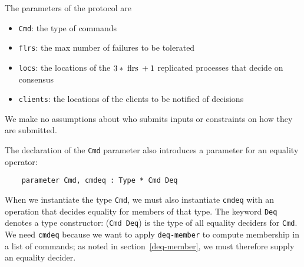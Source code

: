 \documentclass[final]{article}
\newcommand{\listinline}[1]{\text{\lstinline{#1}}}
\begin{document}

The parameters of the protocol are
\begin{itemize}
\item \lstinline{Cmd}: the type of commands
\item \lstinline{flrs}: the max number of failures to be tolerated
\item \lstinline{locs}: the locations of the $3*\listinline{flrs} + 1$
  replicated processes that decide on consensus
\item \lstinline{clients}: the locations of the clients to be notified
  of decisions
\end{itemize}
We make no assumptions about who submits inputs or constraints on how
they are submitted.

The declaration of the \lstinline{Cmd} parameter also introduces a
parameter for an equality operator:
\begin{emlcode}
\begin{lstlisting}
    parameter Cmd, cmdeq : Type * Cmd Deq
\end{lstlisting}
\end{emlcode}
When we instantiate the type \lstinline{Cmd}, we must also instantiate
\lstinline{cmdeq} with an operation that decides equality for members
of that type.  The keyword \lstinline{Deq} denotes a type constructor:
(\lstinline{Cmd Deq}) is the type of all equality deciders for
\lstinline{Cmd}.  We need \lstinline{cmdeq} because we want to apply
\lstinline{deq-member} to compute membership in a list of commands; as
noted in section~\ref{deq-member}, we must therefore supply an
equality decider.


%
%

\end{document}
